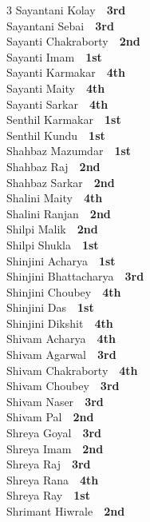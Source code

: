 \documentclass[11pt,a4paper]{article}
\begin{document}
\begin{multicols}{3}
Sayantani Kolay~\dotfill~\textbf{3rd}\\
Sayantani Sebai~\dotfill~\textbf{3rd}\\
Sayanti Chakraborty~\dotfill~\textbf{2nd}\\
Sayanti Imam~\dotfill~\textbf{1st}\\
Sayanti Karmakar~\dotfill~\textbf{4th}\\
Sayanti Maity~\dotfill~\textbf{4th}\\
Sayanti Sarkar~\dotfill~\textbf{4th}\\
Senthil Karmakar~\dotfill~\textbf{1st}\\
Senthil Kundu~\dotfill~\textbf{1st}\\
Shahbaz Mazumdar~\dotfill~\textbf{1st}\\
Shahbaz Raj~\dotfill~\textbf{2nd}\\
Shahbaz Sarkar~\dotfill~\textbf{2nd}\\
Shalini Maity~\dotfill~\textbf{4th}\\
Shalini Ranjan~\dotfill~\textbf{2nd}\\
Shilpi Malik~\dotfill~\textbf{2nd}\\
Shilpi Shukla~\dotfill~\textbf{1st}\\
Shinjini Acharya~\dotfill~\textbf{1st}\\
Shinjini Bhattacharya~\dotfill~\textbf{3rd}\\
Shinjini Choubey~\dotfill~\textbf{4th}\\
Shinjini Das~\dotfill~\textbf{1st}\\
Shinjini Dikshit~\dotfill~\textbf{4th}\\
Shivam Acharya~\dotfill~\textbf{4th}\\
Shivam Agarwal~\dotfill~\textbf{3rd}\\
Shivam Chakraborty~\dotfill~\textbf{4th}\\
Shivam Choubey~\dotfill~\textbf{3rd}\\
Shivam Naser~\dotfill~\textbf{3rd}\\
Shivam Pal~\dotfill~\textbf{2nd}\\
Shreya Goyal~\dotfill~\textbf{3rd}\\
Shreya Imam~\dotfill~\textbf{2nd}\\
Shreya Raj~\dotfill~\textbf{3rd}\\
Shreya Rana~\dotfill~\textbf{4th}\\
Shreya Ray~\dotfill~\textbf{1st}\\
Shrimant Hiwrale~\dotfill~\textbf{2nd}\\

\end{multicols}
\end{document}
